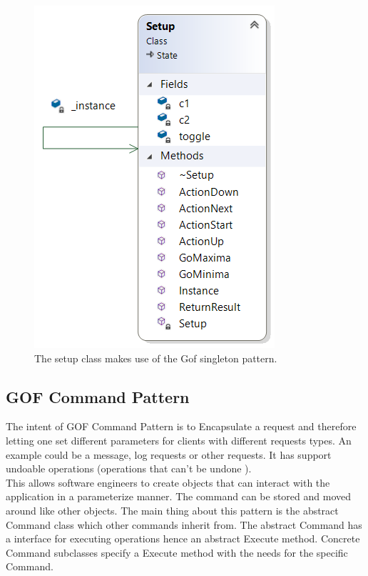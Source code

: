 \begin{figure}[H]
	\centering
	\includegraphics[width=0.35\linewidth]{diagram/singleton}
	\caption[Gof Singleton]{The setup class makes use of the Gof singleton pattern. }
	\label{fig:singleton}
\end{figure}

\clearpage

\subsection{GOF Command Pattern}\label{dp:command}
The intent of GOF Command Pattern is to Encapsulate a request and therefore letting one set different parameters for clients with different requests types. An example could be a message, log requests or other requests. It has support undoable operations (operations that can't be undone ).\\

This allows software engineers to create objects that can interact with the application in a parameterize manner. The command can be stored and moved around like other objects. The main thing about this pattern is the abstract Command class which other commands inherit from. The abstract Command has a interface for executing operations hence an abstract Execute method. Concrete Command subclasses specify a Execute method with the needs for the specific Command. \\
 
